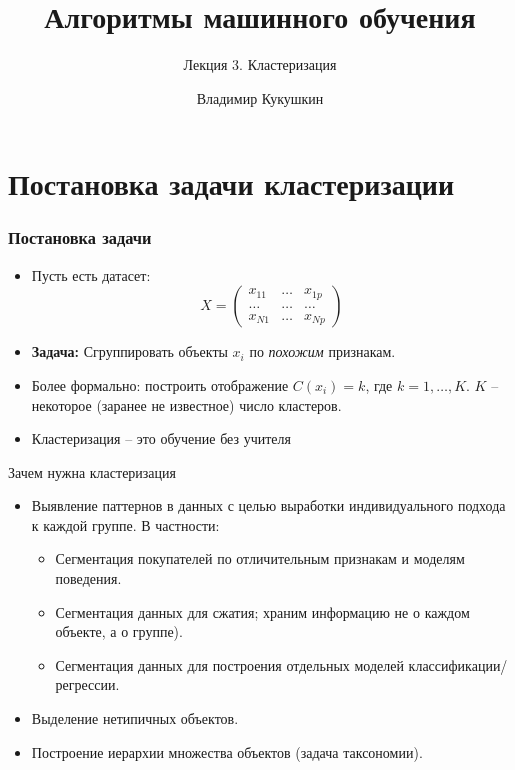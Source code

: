 \documentclass[9pt]{beamer}
\title{Алгоритмы машинного обучения}
\subtitle{Лекция 3. Кластеризация}
\author{Владимир Кукушкин}
\institute{СПбГЭУ - 25.11.2020}
\begin{document}
\titlepage

\section{Постановка задачи кластеризации}

\begin{frame}
 \frametitle{Постановка задачи}
 \begin{itemize}
      \item Пусть есть датасет:
$$X = \begin{pmatrix}
x_{11} & \ldots & x_{1p} \\
\ldots & \ldots & \ldots \\
x_{N1} & \ldots & x_{Np}
\end{pmatrix}
$$
    \item \textbf{Задача:} Сгруппировать объекты $x_i$ по \textit{похожим} признакам.
    \item Более формально: построить отображение $C(x_i) = k$, где $k=1, \ldots, K$. $K$ -- некоторое (заранее не известное) число кластеров.
    \item Кластеризация -- это обучение без учителя
\end{itemize}
\end{frame}

\begin{frame}{Зачем нужна кластеризация}
\begin{itemize}
    \item Выявление паттернов в данных с целью выработки индивидуального подхода к каждой группе. В частности:
    \begin{itemize}
        \item Сегментация покупателей по отличительным признакам и моделям поведения.
        \item Сегментация данных для сжатия; храним информацию не о каждом объекте, а о группе).
        \item Сегментация данных для построения отдельных моделей классификации/регрессии.
    \end{itemize}
    \item Выделение нетипичных объектов.
    \item Построение иерархии множества объектов (задача таксономии).
\end{itemize}
\end{frame}
\end{document}
